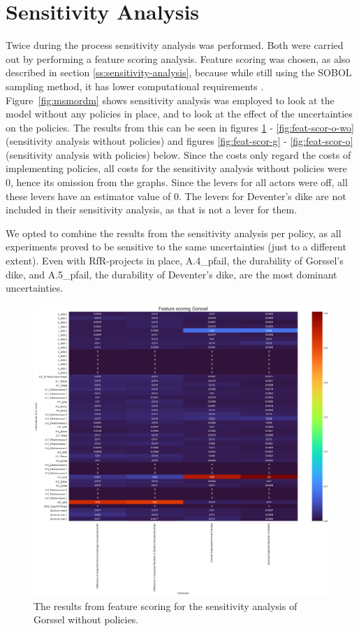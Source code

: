\section{Sensitivity Analysis}
\label{a:sensitivity-analysis}

Twice during the process sensitivity analysis was performed. Both were carried out by performing a feature scoring analysis. Feature scoring was chosen, as also described in section \ref{ss:sensitivity-analysis}, because while still using the SOBOL sampling method, it has lower computational requirements \cite{jaxa-rozen_tree-based_2018}.
Figure~\ref{fig:msmordm} shows sensitivity analysis was employed to look at the model without any policies in place, and to look at the effect of the uncertainties on the policies. The results from this can be seen in figures \ref{fig:feat-scor-g-wo} - \ref{fig:feat-scor-o-wo} (sensitivity analysis without policies) and figures  \ref{fig:feat-scor-g} - \ref{fig:feat-scor-o} (sensitivity analysis with policies) below. Since the costs only regard the costs of implementing policies, all costs for the sensitivity analysis without policies were 0, hence its omission from the graphs. Since the levers for all actors were off, all these levers have an estimator value of 0. The levers for Deventer's dike are not included in their sensitivity analysis, as that is not a lever for them. 

We opted to combine the results from the sensitivity analysis per policy, as all experiments proved to be sensitive to the same uncertainties (just to a different extent). Even with RfR-projects in place, A.4\_pfail, the durability of Gorssel's dike, and A.5\_pfail, the durability of Deventer's dike, are the most dominant uncertainties.

\begin{figure}[h!]
    \centering
    \includegraphics[width=\textwidth]{report/figures/results/sa_model_Gorssel.png}
    \caption{The results from feature scoring for the sensitivity analysis of Gorssel without policies.}
    \label{fig:feat-scor-g-wo}
\end{figure}

